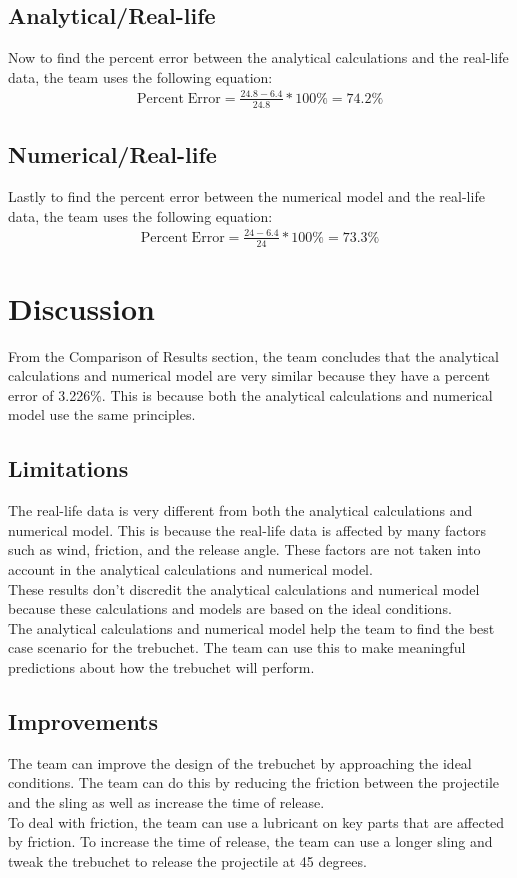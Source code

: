 \documentclass[12pt, titlepage]{article}
\begin{document}
    \subsection{Analytical/Real-life}
    Now to find the percent error between the analytical calculations and the real-life data, the team uses the following equation:
    \begin{align*}
        \mathrm{Percent\;Error} = \frac{24.8 - 6.4}{24.8} * 100\% = 74.2\%
    \end{align*}
    \subsection{Numerical/Real-life}
    Lastly to find the percent error between the numerical model and the real-life data, the team uses the following equation:
    \begin{align*}
        \mathrm{Percent\;Error} = \frac{24 - 6.4}{24} * 100\% = 73.3\%
    \end{align*}
    \newpage
    \section{Discussion}
    From the Comparison of Results section, the team concludes that the 
    analytical calculations and numerical model are very similar because
    they have a percent error of 3.226\%. This is because both the 
    analytical calculations and numerical model use the same principles.
    \subsection{Limitations}
    The real-life data is very different from both the analytical calculations
    and numerical model. This is because the real-life data is affected by
    many factors such as wind, friction, and the release angle. These 
    factors are not taken into account in the analytical calculations and
    numerical model.\\[10pt]
    These results don't discredit the analytical calculations and numerical
    model because these calculations and models are based on the ideal
    conditions.\\[10pt]
    The analytical calculations and numerical model help the team to find 
    the best case scenario for the trebuchet. The team can use this 
    to make meaningful predictions about how the trebuchet will perform.
    \subsection{Improvements}
    The team can improve the design of the trebuchet by approaching the
    ideal conditions. The team can do this by reducing the friction between
    the projectile and the sling as well as increase the time of release.\\[10pt]
    To deal with friction, the team can use a lubricant on key parts that 
    are affected by friction. To increase the time of release, the team can
    use a longer sling and tweak the trebuchet to release the projectile 
    at 45 degrees.
    \newpage
\end{document}
